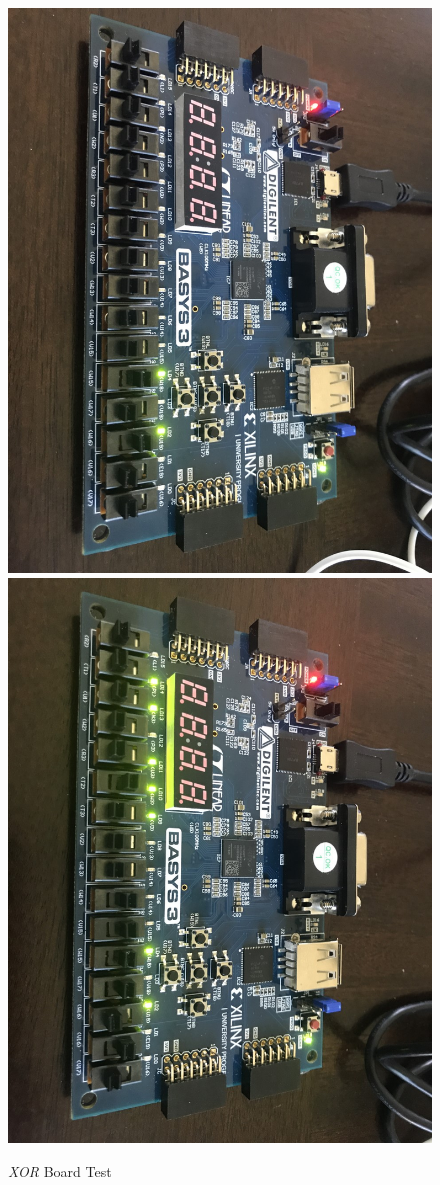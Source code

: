 \documentclass[11pt]{article}
\begin{document}
\begin{figure}[ht]\centering
	\includegraphics[angle=90, width=.8\textwidth]{xor1}
	\includegraphics[angle=90, width=.8\textwidth]{xor2}
	\caption{\textit{XOR} Board Test}
	\label{fig:sim_with_table}
\end{figure}
\clearpage
\end{document}
